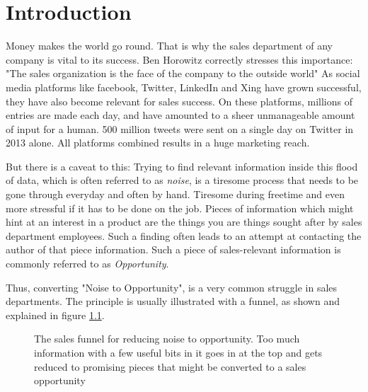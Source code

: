 \chapter{Introduction}\label{ch:introduction}
Money makes the world go round. That is why the sales department
of any company is vital to its success. Ben Horowitz correctly
stresses this importance: "The sales organization is the face of the company to the outside world" \cite{bh:2014}
As social media platforms like facebook, Twitter, LinkedIn and Xing
have grown successful, they have also become relevant for
sales success. On these platforms, millions of entries are made each day,
and have amounted to a sheer unmanageable amount of input for a human.
500 million tweets were sent on a single day on Twitter in 2013 alone.
All platforms combined results in a huge marketing reach.
\newline

But there is a caveat to this: Trying to find relevant information inside this
flood of data, which is often referred to as \textit{noise}, is a tiresome
process that needs to be gone through everyday and often by hand.
Tiresome during freetime and even more stressful if it has to be done on the job.
Pieces of information which might hint at an interest in a product are the things
you are things sought after by sales department employees.
Such a finding often leads to an attempt at contacting the author of that
piece information. Such a piece of sales-relevant information is commonly
referred to as \textit{Opportunity}.
\newline

Thus, converting "Noise to Opportunity", is a very common struggle
in sales departments. The principle is usually illustrated with a funnel,
as shown and explained in figure \ref{fig:sales-funnel}.


\begin{figure}[bth]
    \caption{The sales funnel for reducing noise to opportunity. Too much
    information with a few useful bits in it goes in at the top and gets
    reduced to promising pieces that might be converted to a sales opportunity}
    \label{fig:sales-funnel}
\end{figure}

